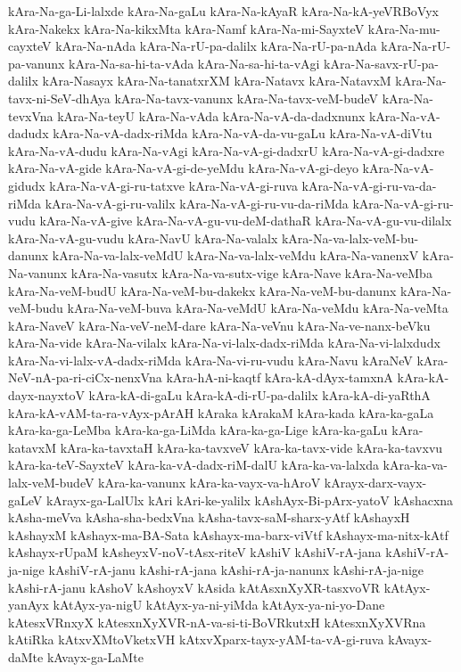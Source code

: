 {kAra-Na-ga-Li-lalxde
kAra-Na-gaLu
kAra-Na-kAyaR
kAra-Na-kA-yeVRBoVyx
kAra-Nakekx
kAra-Na-kikxMta
kAra-Namf
kAra-Na-mi-SayxteV
kAra-Na-mu-cayxteV
kAra-Na-nAda
kAra-Na-rU-pa-dalilx
kAra-Na-rU-pa-nAda
kAra-Na-rU-pa-vanunx
kAra-Na-sa-hi-ta-vAda
kAra-Na-sa-hi-ta-vAgi
kAra-Na-savx-rU-pa-dalilx
kAra-Nasayx
kAra-Na-tanatxrXM
kAra-Natavx
kAra-NatavxM
kAra-Na-tavx-ni-SeV-dhAya
kAra-Na-tavx-vanunx
kAra-Na-tavx-veM-budeV
kAra-Na-tevxVna
kAra-Na-teyU
kAra-Na-vAda
kAra-Na-vA-da-dadxnunx
kAra-Na-vA-dadudx
kAra-Na-vA-dadx-riMda
kAra-Na-vA-da-vu-gaLu
kAra-Na-vA-diVtu
kAra-Na-vA-dudu
kAra-Na-vAgi
kAra-Na-vA-gi-dadxrU
kAra-Na-vA-gi-dadxre
kAra-Na-vA-gide
kAra-Na-vA-gi-de-yeMdu
kAra-Na-vA-gi-deyo
kAra-Na-vA-gidudx
kAra-Na-vA-gi-ru-tatxve
kAra-Na-vA-gi-ruva
kAra-Na-vA-gi-ru-va-da-riMda
kAra-Na-vA-gi-ru-valilx
kAra-Na-vA-gi-ru-vu-da-riMda
kAra-Na-vA-gi-ru-vudu
kAra-Na-vA-give
kAra-Na-vA-gu-vu-deM-dathaR
kAra-Na-vA-gu-vu-dilalx
kAra-Na-vA-gu-vudu
kAra-NavU
kAra-Na-valalx
kAra-Na-va-lalx-veM-bu-danunx
kAra-Na-va-lalx-veMdU
kAra-Na-va-lalx-veMdu
kAra-Na-vanenxV
kAra-Na-vanunx
kAra-Na-vasutx
kAra-Na-va-sutx-vige
kAra-Nave
kAra-Na-veMba
kAra-Na-veM-budU
kAra-Na-veM-bu-dakekx
kAra-Na-veM-bu-danunx
kAra-Na-veM-budu
kAra-Na-veM-buva
kAra-Na-veMdU
kAra-Na-veMdu
kAra-Na-veMta
kAra-NaveV
kAra-Na-veV-neM-dare
kAra-Na-veVnu
kAra-Na-ve-nanx-beVku
kAra-Na-vide
kAra-Na-vilalx
kAra-Na-vi-lalx-dadx-riMda
kAra-Na-vi-lalxdudx
kAra-Na-vi-lalx-vA-dadx-riMda
kAra-Na-vi-ru-vudu
kAra-Navu
kAraNeV
kAra-NeV-nA-pa-ri-ciCx-nenxVna
kAra-hA-ni-kaqtf
kAra-kA-dAyx-tamxnA
kAra-kA-dayx-nayxtoV
kAra-kA-di-gaLu
kAra-kA-di-rU-pa-dalilx
kAra-kA-di-yaRthA
kAra-kA-vAM-ta-ra-vAyx-pArAH
kAraka
kArakaM
kAra-kada
kAra-ka-gaLa
kAra-ka-ga-LeMba
kAra-ka-ga-LiMda
kAra-ka-ga-Lige
kAra-ka-gaLu
kAra-katavxM
kAra-ka-tavxtaH
kAra-ka-tavxveV
kAra-ka-tavx-vide
kAra-ka-tavxvu
kAra-ka-teV-SayxteV
kAra-ka-vA-dadx-riM-dalU
kAra-ka-va-lalxda
kAra-ka-va-lalx-veM-budeV
kAra-ka-vanunx
kAra-ka-vayx-va-hAroV
kArayx-darx-vayx-gaLeV
kArayx-ga-LalUlx
kAri
kAri-ke-yalilx
kAshAyx-Bi-pArx-yatoV
kAshacxna
kAsha-meVva
kAsha-sha-bedxVna
kAsha-tavx-saM-sharx-yAtf
kAshayxH
kAshayxM
kAshayx-ma-BA-Sata
kAshayx-ma-barx-viVtf
kAshayx-ma-nitx-kAtf
kAshayx-rUpaM
kAsheyxV-noV-tAsx-riteV
kAshiV
kAshiV-rA-jana
kAshiV-rA-ja-nige
kAshiV-rA-janu
kAshi-rA-jana
kAshi-rA-ja-nanunx
kAshi-rA-ja-nige
kAshi-rA-janu
kAshoV
kAshoyxV
kAsida
kAtAsxnXyXR-tasxvoVR
kAtAyx-yanAyx
kAtAyx-ya-nigU
kAtAyx-ya-ni-yiMda
kAtAyx-ya-ni-yo-Dane
kAtesxVRnxyX
kAtesxnXyXVR-nA-va-si-ti-BoVRkutxH
kAtesxnXyXVRna
kAtiRka
kAtxvXMtoVketxVH
kAtxvXparx-tayx-yAM-ta-vA-gi-ruva
kAvayx-daMte
kAvayx-ga-LaMte
}
